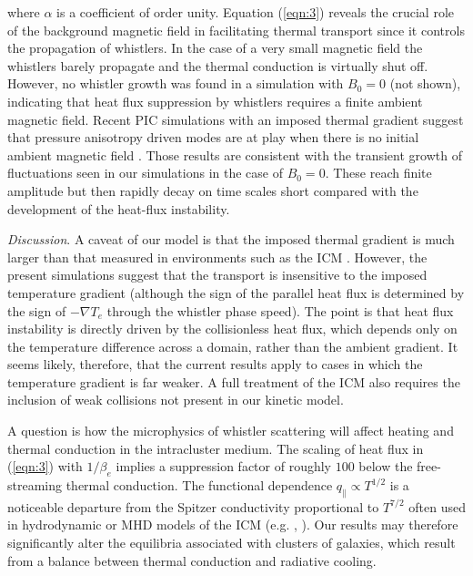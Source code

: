 \documentclass[%
 reprint,
superscriptaddress,
 amsmath,amssymb,
 aps,
]{revtex4-1}
\begin{document}
where $\alpha$ is a coefficient of order unity. Equation (\ref{eqn:3})
reveals the crucial role of the background magnetic field in
facilitating thermal transport since it controls the propagation of
whistlers. In the case of a very small magnetic field the whistlers
barely propagate and the thermal conduction is virtually shut
off. However, no whistler growth was found in a simulation with
$B_{0}=0$ (not shown), indicating that heat flux suppression by
whistlers requires a finite ambient magnetic field. Recent PIC
simulations with an imposed thermal gradient suggest that pressure
anisotropy driven modes are at play when there is no initial ambient
magnetic field \cite{Schoeffler2017}. Those results are consistent
with the transient growth of fluctuations seen in our simulations in
the case of $B_{0}=0$. These reach finite amplitude but then rapidly
decay on time scales short compared with the development of the
heat-flux instability.

\textit{Discussion}.  A caveat of our model is that the imposed
thermal gradient is much larger than that measured in environments
such as the ICM \cite{Levinson1992}. However, the present simulations
suggest that the transport is insensitive to the imposed temperature
gradient (although the sign of the parallel heat flux is determined by
the sign of $-\nabla T_{e}$ through the whistler phase speed). The
point is that heat flux instability is directly driven by the
collisionless heat flux, which depends only on the temperature
difference across a domain, rather than the ambient gradient. It seems
likely, therefore, that the current results apply to cases in which
the temperature gradient is far weaker. A full treatment of the ICM
also requires the inclusion of weak collisions not present in our
kinetic model.

A question is how the microphysics of whistler scattering will affect
heating and thermal conduction in the intracluster medium. The scaling
of heat flux in (\ref{eqn:3}) with $1/\beta_e$ implies a suppression
factor of roughly $100$ below the free-streaming thermal conduction.
The functional dependence $q_{\parallel} \propto T^{1/2}$ is a
noticeable departure from the Spitzer conductivity \cite{Spitzer1962}
proportional to $T^{7/2}$ often used in hydrodynamic or MHD models of
the ICM (e.g. \cite{Ruszkowski2010}, \cite{Yang2016b}). Our results
may therefore significantly alter the equilibria associated with
clusters of galaxies, which result from a balance between thermal
conduction and radiative cooling.
\end{document}

